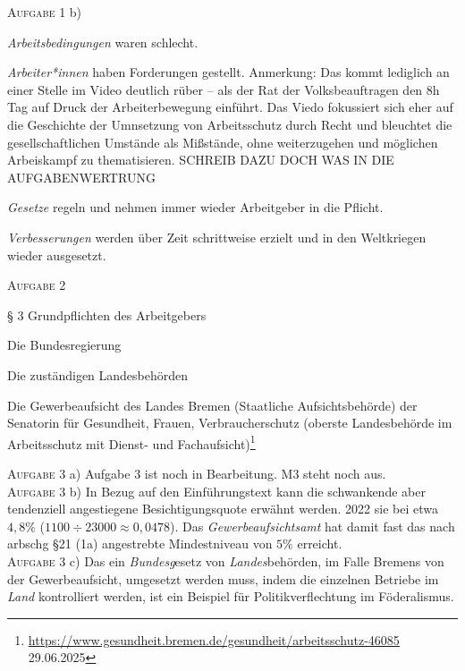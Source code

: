 \textsc{Aufgabe 1} b) \quad
\begin{myitemize}
    \item \emph{Arbeitsbedingungen} waren schlecht.
    \item \emph{Arbeiter*innen} haben Forderungen gestellt. Anmerkung: Das kommt lediglich an einer Stelle im Video deutlich rüber -- als der Rat der Volksbeauftragen den 8h Tag auf Druck der Arbeiterbewegung einführt. Das Viedo fokussiert sich eher auf die Geschichte der Umnsetzung von Arbeitsschutz durch Recht und bleuchtet die gesellschaftlichen Umstände als Mißstände, ohne weiterzugehen und möglichen Arbeiskampf zu thematisieren. SCHREIB DAZU DOCH WAS IN DIE AUFGABENWERTRUNG
    \item \emph{Gesetze} regeln und nehmen immer wieder Arbeitgeber in die Pflicht. 
    \item \emph{Verbesserungen} werden über Zeit schrittweise erzielt und in den Weltkriegen wieder ausgesetzt. 
\end{myitemize}


\textsc{Aufgabe 2} \quad
\begin{myitemize}
    \item § 3 Grundpflichten des Arbeitgebers
    \item Die Bundesregierung
    \item Die zuständigen Landesbehörden
    \item Die Gewerbeaufsicht des Landes Bremen (Staatliche Aufsichtsbehörde) der Senatorin für Gesundheit, Frauen, Verbraucherschutz (oberste Landesbehörde im Arbeitsschutz mit Dienst- und Fachaufsicht)\footnote{\url{https://www.gesundheit.bremen.de/gesundheit/arbeitsschutz-46085} 29.06.2025}
\end{myitemize}


\textsc{Aufgabe 3} a) \quad
Aufgabe 3 ist noch in Bearbeitung. M3 steht noch aus.
\\

\textsc{Aufgabe 3} b) \quad
In Bezug auf den Einführungstext kann die schwankende aber tendenziell angestiegene Besichtigungsquote erwähnt werden. 2022 sie bei etwa $4,8\%$ ($1100 \div 23000 \approx 0,0478$). Das \emph{Gewerbeaufsichtsamt} hat damit fast das nach \gls{arbschg} §21 (1a) angestrebte Mindestniveau von $5\%$ erreicht. 
\\

\textsc{Aufgabe 3} c) \quad
Das ein \emph{Bundesg}esetz von \emph{Landes}behörden, im Falle Bremens von der Gewerbeaufsicht, umgesetzt werden muss, indem die einzelnen Betriebe im \emph{Land} kontrolliert werden, ist ein Beispiel für Politikverflechtung im Föderalismus. 


